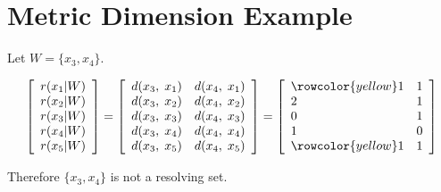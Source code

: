 \documentclass[12pt]{article}
\def\hlr{\rowcolor{yellow}}
\begin{document}
\newpage
\section*{Metric Dimension Example}
\begin{minipage}[t]{0.65\textwidth}
\setlength{\parskip}{\baselineskip}

Let $W = \{x_3, x_4\}$.

\[
\left[ \begin{array}{l}
	r(x_1|W) \\
	r(x_2|W) \\
	r(x_3|W) \\
	r(x_4|W) \\
	r(x_5|W)
\end{array} \right]
=
\left[ \begin{array}{ll}
	d(x_3,\; x_1) & d(x_4,\; x_1) \\
	d(x_3,\; x_2) & d(x_4,\; x_2) \\
	d(x_3,\; x_3) & d(x_4,\; x_3) \\
	d(x_3,\; x_4) & d(x_4,\; x_4) \\
	d(x_3,\; x_5) & d(x_4,\; x_5)
\end{array} \right]
=
\left[ \begin{array}{ll}
	\hlr 1 & 1 \\
	     2 & 1 \\
	     0 & 1 \\
	     1 & 0 \\
	\hlr 1 & 1
\end{array} \right]
\]

Therefore $\{x_3, x_4\}$ is not a resolving set.

\end{minipage}
\hfill
\begin{minipage}[t]{0.3\textwidth}
	\begin{figure}[H]
		
	\end{figure}
\end{minipage}

\newpage
\end{document}
